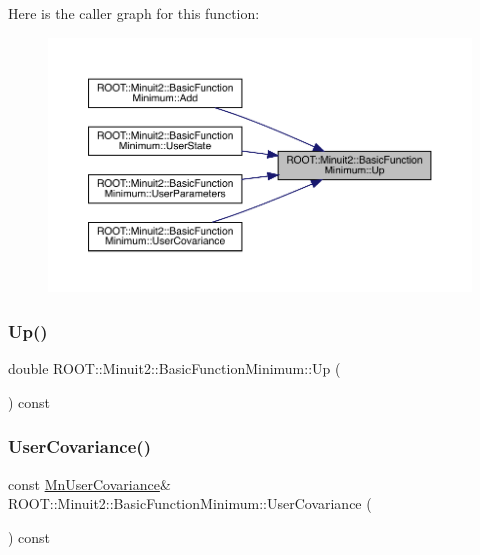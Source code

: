 Here is the caller graph for this function\+:\nopagebreak
\begin{figure}[H]
\begin{center}
\leavevmode
\includegraphics[width=350pt]{de/d25/classROOT_1_1Minuit2_1_1BasicFunctionMinimum_a576364a872f31ede72df956b103e0d6e_icgraph}
\end{center}
\end{figure}
\mbox{\label{classROOT_1_1Minuit2_1_1BasicFunctionMinimum_a576364a872f31ede72df956b103e0d6e}} 
\subsubsection{\texorpdfstring{Up()}{Up()}\hspace{0.1cm}{\footnotesize\ttfamily [2/2]}}
{\footnotesize\ttfamily double R\+O\+O\+T\+::\+Minuit2\+::\+Basic\+Function\+Minimum\+::\+Up (\begin{DoxyParamCaption}{ }\end{DoxyParamCaption}) const\hspace{0.3cm}{\ttfamily [inline]}}

\mbox{\label{classROOT_1_1Minuit2_1_1BasicFunctionMinimum_a4f06adfe70411becfe7aa48f6bce1f22}} 
\subsubsection{\texorpdfstring{UserCovariance()}{UserCovariance()}\hspace{0.1cm}{\footnotesize\ttfamily [1/2]}}
{\footnotesize\ttfamily const \mbox{\hyperlink{classROOT_1_1Minuit2_1_1MnUserCovariance}{Mn\+User\+Covariance}}\& R\+O\+O\+T\+::\+Minuit2\+::\+Basic\+Function\+Minimum\+::\+User\+Covariance (\begin{DoxyParamCaption}{ }\end{DoxyParamCaption}) const\hspace{0.3cm}{\ttfamily [inline]}}

